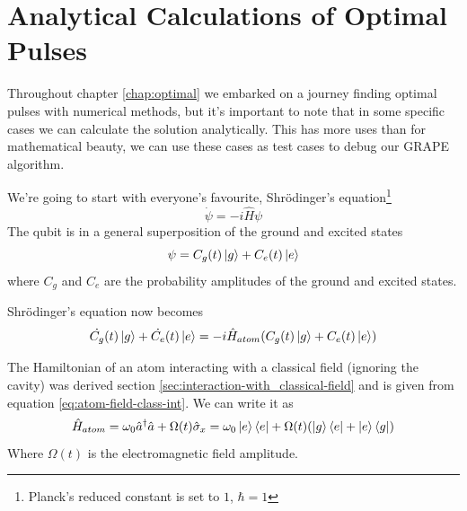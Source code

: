 \section{Analytical Calculations of Optimal Pulses} \label{appen:annalytic}
Throughout chapter \ref{chap:optimal} we embarked on a journey finding optimal pulses with numerical methods, but it's important to note that in some specific cases we can calculate the solution analytically. This has more uses than for mathematical beauty, we can use these cases as test cases to debug our GRAPE algorithm.

We're going to start with everyone's favourite, Shr\"{o}dinger's equation\footnote{Planck's reduced constant is set to $1$, $\hbar = 1$}
\[
    \dot{\psi} = -i \hat{H} \psi
\]
The qubit is in a general superposition of the ground and excited states
\[
    \psi = C_g (t) \ket{g} + C_e (t) \ket{e}
\]
where $C_g$ and $C_e$ are the probability amplitudes of the ground and excited states.

Shr\"{o}dinger's equation now becomes
\begin{equation} \label{eq:shrod-psi-explit}
     \dot{C_g} (t) \ket{g} + \dot{C_e} (t) \ket{e} = -i \hat{H}_{atom}  (C_g (t) \ket{g} + C_e (t) \ket{e})
\end{equation}

The Hamiltonian of an atom interacting with a classical field (ignoring the cavity) was derived section \ref{sec:interaction-with_classical-field} and is given from equation \ref{eq:atom-field-class-int}. We can write it as
\[
    \hat{H}_{atom} = \omega_0 \hat{a}^\dag \hat{a} + \Omega (t)\hat{\sigma}_x= \omega_0\ket{e}\bra{e} + \Omega (t) (\ket{g}\bra{e} + \ket{e}\bra{g})
\]
Where $\Omega (t)$ is the electromagnetic field amplitude.

